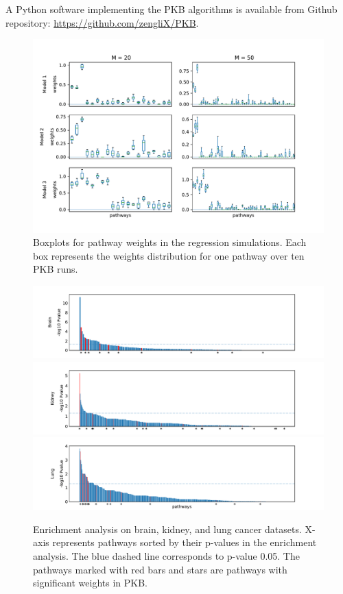 \documentclass[a4paper,12pt]{article}
\begin{document}
A Python software implementing the PKB algorithms is available from Github repository: \href{https://github.com/zengliX/PKB}{https://github.com/zengliX/PKB}. 
\newpage
	
	
	
	\newpage
	\begin{figure}[htp]
		\centering
		\includegraphics[width=1.07\textwidth]{simu_reg_weights.pdf}
		\caption{Boxplots for pathway weights in the regression simulations. Each box represents the weights distribution for one pathway over ten PKB runs.}
		\label{fig:reg_weights}
	\end{figure}
\newpage
\begin{figure}[h]
	\centering
	\includegraphics[width=\textwidth]{GSEA_Brain.pdf}\\ \vspace{-3mm}
	\includegraphics[width=\textwidth]{GSEA_Kidney.pdf}\\ \vspace{-3mm}
	\includegraphics[width=\textwidth]{GSEA_Lung.pdf}
	\caption{Enrichment analysis on brain, kidney, and lung cancer datasets. X-axis represents pathways sorted by their p-values in the enrichment analysis. The blue dashed line corresponds to p-value 0.05. The pathways marked with red bars and stars are pathways with significant weights in PKB.}
	\label{fig:gsea}
\end{figure}
\end{document}

